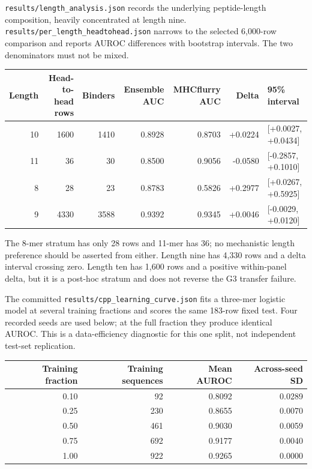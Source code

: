 
\texttt{results/length\_analysis.json} records the underlying peptide-length composition, heavily concentrated at length nine. \texttt{results/per\_length\_headtohead.json} narrows to the selected 6,000-row comparison and reports AUROC differences with bootstrap intervals. The two denominators must not be mixed.

\begin{longtable}[]{@{}rrrrrrl@{}}
\toprule
Length & Head-to-head rows & Binders & Ensemble AUC & MHCflurry AUC & Delta & 95\% interval\tabularnewline
\midrule
\endhead
10 & 1600 & 1410 & 0.8928 & 0.8703 & +0.0224 & {[}+0.0027, +0.0434{]}\tabularnewline
11 & 36 & 30 & 0.8500 & 0.9056 & -0.0580 & {[}-0.2857, +0.1010{]}\tabularnewline
8 & 28 & 23 & 0.8783 & 0.5826 & +0.2977 & {[}+0.0267, +0.5925{]}\tabularnewline
9 & 4330 & 3588 & 0.9392 & 0.9345 & +0.0046 & {[}-0.0029, +0.0120{]}\tabularnewline
\bottomrule
\end{longtable}

The 8-mer stratum has only 28 rows and 11-mer has 36; no mechanistic length preference should be asserted from either. Length nine has 4,330 rows and a delta interval crossing zero. Length ten has 1,600 rows and a positive within-panel delta, but it is a post-hoc stratum and does not reverse the G3 transfer failure.


The committed \texttt{results/cpp\_learning\_curve.json} fits a three-mer logistic model at several training fractions and scores the same 183-row fixed test. Four recorded seeds are used below; at the full fraction they produce identical AUROC. This is a data-efficiency diagnostic for this one split, not independent test-set replication.

\begin{longtable}[]{@{}rrrr@{}}
\toprule
Training fraction & Training sequences & Mean AUROC & Across-seed SD\tabularnewline
\midrule
\endhead
0.10 & 92 & 0.8092 & 0.0289\tabularnewline
0.25 & 230 & 0.8655 & 0.0070\tabularnewline
0.50 & 461 & 0.9030 & 0.0059\tabularnewline
0.75 & 692 & 0.9177 & 0.0040\tabularnewline
1.00 & 922 & 0.9265 & 0.0000\tabularnewline
\bottomrule
\end{longtable}

